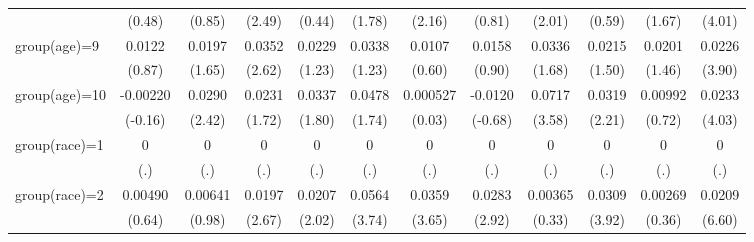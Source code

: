 \begin{table}[htbp]
\begin{tabular}{l*{11}{c}}
                    &      (0.48)         &      (0.85)         &      (2.49)         &      (0.44)         &      (1.78)         &      (2.16)         &      (0.81)         &      (2.01)         &      (0.59)         &      (1.67)         &      (4.01)         \\
[1em]
group(age)=9        &      0.0122         &      0.0197         &      0.0352\sym{*}  &      0.0229         &      0.0338         &      0.0107         &      0.0158         &      0.0336         &      0.0215         &      0.0201         &      0.0226\sym{***}\\
                    &      (0.87)         &      (1.65)         &      (2.62)         &      (1.23)         &      (1.23)         &      (0.60)         &      (0.90)         &      (1.68)         &      (1.50)         &      (1.46)         &      (3.90)         \\
[1em]
group(age)=10       &    -0.00220         &      0.0290\sym{*}  &      0.0231         &      0.0337         &      0.0478         &    0.000527         &     -0.0120         &      0.0717\sym{***}&      0.0319\sym{*}  &     0.00992         &      0.0233\sym{***}\\
                    &     (-0.16)         &      (2.42)         &      (1.72)         &      (1.80)         &      (1.74)         &      (0.03)         &     (-0.68)         &      (3.58)         &      (2.21)         &      (0.72)         &      (4.03)         \\
[1em]
group(race)=1       &           0         &           0         &           0         &           0         &           0         &           0         &           0         &           0         &           0         &           0         &           0         \\
                    &         (.)         &         (.)         &         (.)         &         (.)         &         (.)         &         (.)         &         (.)         &         (.)         &         (.)         &         (.)         &         (.)         \\
[1em]
group(race)=2       &     0.00490         &     0.00641         &      0.0197\sym{*}  &      0.0207\sym{*}  &      0.0564\sym{***}&      0.0359\sym{***}&      0.0283\sym{**} &     0.00365         &      0.0309\sym{***}&     0.00269         &      0.0209\sym{***}\\
                    &      (0.64)         &      (0.98)         &      (2.67)         &      (2.02)         &      (3.74)         &      (3.65)         &      (2.92)         &      (0.33)         &      (3.92)         &      (0.36)         &      (6.60)         \\

\end{tabular}
\end{table}
